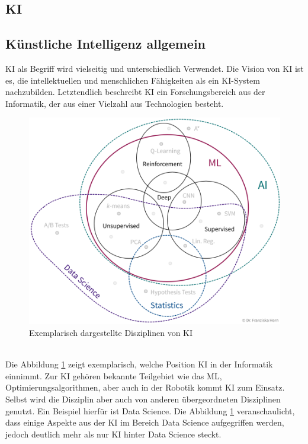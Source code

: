 \begin{onehalfspace}

    \newpage
    \section{\ac{KI}}
    \label{subsec:KIandML}
    \subsection{Künstliche Intelligenz allgemein}
    \label{subsubsec:KIAllgemein}
        \ac{KI} als Begriff wird vielseitig und unterschiedlich Verwendet. Die Vision von \ac{KI} ist es, die intellektuellen und menschlichen Fähigkeiten als ein KI-System nachzubilden.\cite{Lis2019} Letztendlich beschreibt \ac{KI} ein Forschungsbereich aus der Informatik, der aus einer Vielzahl aus Technologien besteht.\cite{HEGKI2019Definition} 
        \begin{figure}[h]
            \centering
            \includegraphics[width = \textwidth]{Bilder/ml_toolset.png}
            \caption{Exemplarisch dargestellte Disziplinen von \ac{KI}\cite{Horn2022}}
            \label{fig:ml_toolset}
        \end{figure}
        \\
        Die Abbildung \ref*{fig:ml_toolset} zeigt exemplarisch, welche Position \ac*{KI} in der Informatik einnimmt. Zur \ac{KI} gehören bekannte Teilgebiet wie das \ac*{ML}, Optimierungsalgorithmen, aber auch  in der Robotik kommt \ac{KI} zum Einsatz. Selbst wird die Disziplin aber auch von anderen übergeordneten Disziplinen genutzt.\cite{HEGKI2019Definition} Ein Beispiel hierfür ist Data Science. Die Abbildung \ref*{fig:ml_toolset} veranschaulicht, dass einige Aspekte aus der \ac{KI} im Bereich Data Science aufgegriffen werden, jedoch deutlich mehr als nur \ac{KI} hinter Data Science steckt.

\end{onehalfspace}
